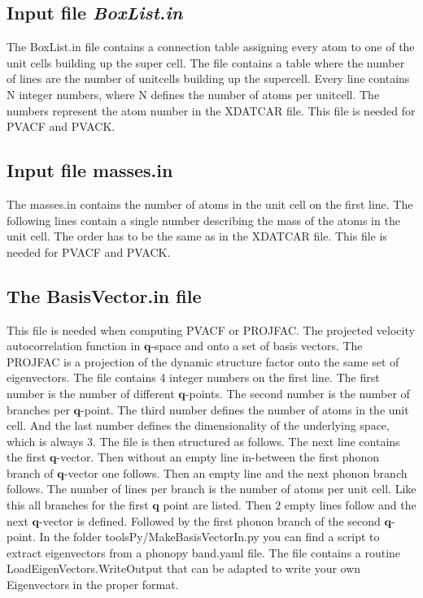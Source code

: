 \documentclass[a4paper,12pt]{article}
\begin{document}
\subsection{Input file \textit{BoxList.in}}\label{BoxFile}
The BoxList.in file contains a connection table assigning every atom
to one of the unit cells building up the super cell.
The file contains a table where the number of lines are the number of unitcells
building up the supercell. Every line contains N integer numbers, where N defines
the number of atoms per unitcell. The numbers represent the atom number in the 
XDATCAR file. This file is needed for PVACF and PVACK.




\subsection{Input file \textbf{masses.in}}\label{MassFile}
The masses.in contains the number of atoms in the unit cell on the first line.
The following lines contain a single number describing the mass of the atoms in the unit cell.
The order has to be the same as in the XDATCAR file.
This file is needed for PVACF and PVACK.




\subsection{The \textbf{BasisVector.in} file}
This file is needed when computing PVACF or PROJFAC. The projected velocity autocorrelation
function in $\mathbf{q}$-space and onto a set of basis vectors. The PROJFAC
is a projection of the dynamic structure factor onto the same set of eigenvectors.
The file contains 4 integer numbers on the first line. The first number is the 
number of different $\mathbf{q}$-points. The second number is the number of branches per
$\mathbf{q}$-point. The third number defines the number of atoms in the unit cell. And the
last number defines the dimensionality of the underlying space, which is always 3.
The file is then structured as follows. The next line contains the first $\mathbf{q}$-vector.
Then without an empty line in-between the first phonon branch of $\mathbf{q}$-vector one follows.
Then an empty line and the next phonon branch follows. The number of lines per
branch is the number of atoms per unit cell.
Like this all branches for the first $\mathbf{q}$ point are listed. Then 2 empty lines
follow and the next $\mathbf{q}$-vector is defined. Followed by the first phonon branch of
the second $\mathbf{q}$-point.
In the folder toolsPy/MakeBasisVectorIn.py you can find a script to extract eigenvectors
from a phonopy band.yaml file. The file contains a routine LoadEigenVectors.WriteOutput 
that can be adapted to write your own Eigenvectors in the proper format.
\end{document}
